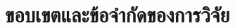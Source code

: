\section{ขอบเขตและข้อจำกัดของการวิจัย}


\begin{subitems}
    \item \dotfill
    \item \dotfill
\end{subitems}

